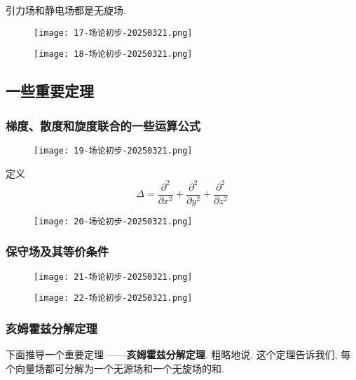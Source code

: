 引力场和静电场都是无旋场.

\begin{figure}[H]
\centering
\texttt{[image: 17-场论初步-20250321.png]}
\label{}
\end{figure}

\begin{figure}[H]
\centering
\texttt{[image: 18-场论初步-20250321.png]}
\label{}
\end{figure}

\subsection{一些重要定理}

\subsubsection{梯度、散度和旋度联合的一些运算公式}

\begin{figure}[H]
\centering
\texttt{[image: 19-场论初步-20250321.png]}
\label{}
\end{figure}
定义
\[
\Delta=\frac{ \partial^2   }{ \partial x ^2 } +\frac{ \partial^2   }{ \partial y ^2 } +\frac{ \partial^2   }{ \partial z ^2 } 
\]
\begin{figure}[H]
\centering
\texttt{[image: 20-场论初步-20250321.png]}
\label{}
\end{figure}

\subsubsection{保守场及其等价条件}

\begin{figure}[H]
\centering
\texttt{[image: 21-场论初步-20250321.png]}
\label{}
\end{figure}

\begin{figure}[H]
\centering
\texttt{[image: 22-场论初步-20250321.png]}
\label{}
\end{figure}

\subsubsection{亥姆霍兹分解定理}

下面推导一个重要定理 ——\textbf{亥姆霍兹分解定理}. 粗略地说, 这个定理告诉我们, 每个向量场都可分解为一个无源场和一个无旋场的和.


